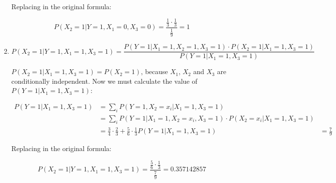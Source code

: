 \documentclass[11]{article}
\begin{document}
\begin{enumerate}[label=(\alph*)]
\begin{enumerate}[label*=.\arabic*]
Replacing in the original formula:

$$P(X_2=1|Y=1,X_1=0,X_3=0)=\frac{\frac{1}{3} \cdot \frac{1}{3}}{\frac{1}{9}}=1$$

\item
$$P(X_2=1|Y=1,X_1=1,X_3=1)=\frac{P(Y=1|X_1=1,X_2=1,X_3=1) \cdot P(X_2=1|X_1=1,X_3=1)}{P(Y=1|X_1=1,X_3=1)}$$

$P(X_2=1|X_1=1,X_3=1)=P(X_2=1)$, because $X_1$, $X_2$ and $X_3$ are conditionally independent. Now we must calculate the value of $P(Y=1|X_1=1,X_3=1)$:

\begin{align*}
P(Y=1|X_1=1,X_3=1) &= \sum_{i}P(Y=1,X_2=x_i|X_1=1,X_3=1)\\
&= \sum_{i}P(Y=1|X_1=1,X_2=x_i,X_3=1)\cdot P(X_2=x_i|X_1=1,X_3=1)\\
&= \frac{3}{4} \cdot \frac{2}{3} + \frac{5}{6} \cdot \frac{1}{3}
P(Y=1|X_1=1,X_3=1) &= \frac{7}{9}
\end{align*}

Replacing in the original formula:

$$P(X_2=1|Y=1,X_1=1,X_3=1)=\frac{\frac{5}{6} \cdot \frac{1}{3}}{\frac{7}{9}}=0.357142857$$

\end{enumerate}
\end{enumerate}
\end{document}
